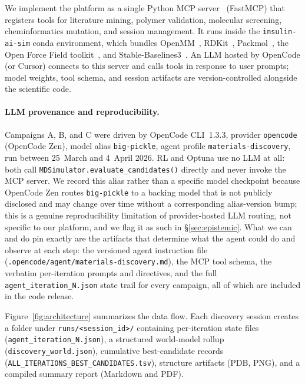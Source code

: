 \documentclass[twocolumn]{fairmeta}
\begin{document}
We implement the platform as a single Python MCP server~\cite{mcp2024} (FastMCP) that registers tools for literature mining, polymer validation, molecular screening, cheminformatics mutation, and session management.
It runs inside the \texttt{insulin-ai-sim} conda environment, which bundles OpenMM~\cite{eastman2017openmm}, RDKit~\cite{landrum2013rdkit}, Packmol~\cite{packmol2009}, the Open Force Field toolkit~\cite{qiu2021development}, and Stable-Baselines3~\cite{sb3_2021}.
An LLM hosted by OpenCode (or Cursor) connects to this server and calls tools in response to user prompts; model weights, tool schema, and session artifacts are version-controlled alongside the scientific code.

\paragraph{LLM provenance and reproducibility.}
Campaigns A, B, and C were driven by OpenCode CLI~1.3.3, provider \texttt{opencode} (OpenCode Zen), model alias \texttt{big-pickle}, agent profile \texttt{materials-discovery}, run between 25~March and 4~April 2026.
RL and Optuna use no LLM at all: both call \texttt{MDSimulator.evaluate\_candidates()} directly and never invoke the MCP server.
We record this alias rather than a specific model checkpoint because OpenCode Zen routes \texttt{big-pickle} to a backing model that is not publicly disclosed and may change over time without a corresponding alias-version bump; this is a genuine reproducibility limitation of provider-hosted LLM routing, not specific to our platform, and we flag it as such in \S\ref{sec:epistemic}.
What we can and do pin exactly are the artifacts that determine what the agent could do and observe at each step: the versioned agent instruction file (\texttt{.opencode/agent/materials-discovery.md}), the MCP tool schema, the verbatim per-iteration prompts and directives, and the full \texttt{agent\_iteration\_N.json} state trail for every campaign, all of which are included in the code release.

Figure~\ref{fig:architecture} summarizes the data flow.
Each discovery session creates a folder under \texttt{runs/<session\_id>/} containing per-iteration state files (\texttt{agent\_iteration\_N.json}), a structured world-model rollup (\texttt{discovery\_world.json}), cumulative best-candidate records (\texttt{ALL\_ITERATIONS\_BEST\_CANDIDATES.tsv}), structure artifacts (PDB, PNG), and a compiled summary report (Markdown and PDF).
\end{document}
